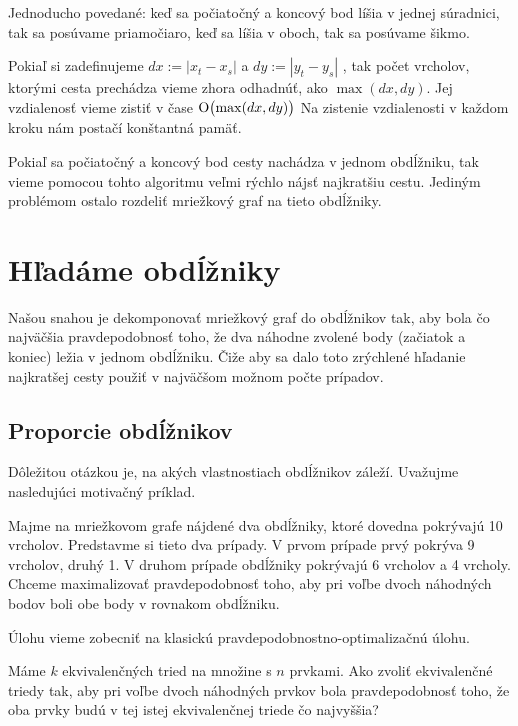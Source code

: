 Jednoducho povedané: keď sa počiatočný a koncový bod líšia v jednej súradnici, tak sa posúvame priamočiaro,
keď sa líšia v oboch, tak sa posúvame šikmo.


Pokiaľ si zadefinujeme 
$ dx := |x_t - x_s|$ 
a
$ dy :=|y_t - y_s| $
 , tak počet vrcholov,
ktorými cesta prechádza vieme zhora odhadnúť, ako $\max(dx, dy)$. Jej vzdialenosť vieme zistiť v čase  $\operatorname{O}\bigl(\max(dx, dy)\bigr)$
Na zistenie vzdialenosti v každom kroku nám postačí konštantná pamäť.


Pokiaľ sa počiatočný a koncový bod cesty nachádza v jednom obdĺžniku, tak vieme pomocou tohto algoritmu veľmi rýchlo nájsť najkratšiu cestu.
Jediným problémom ostalo rozdeliť mriežkový graf na tieto obdĺžniky. 


\section{Hľadáme obdĺžniky}
Našou snahou je dekomponovať mriežkový graf do obdĺžnikov tak, aby bola čo najväčšia pravdepodobnosť toho, že 
dva náhodne zvolené body (začiatok a koniec) ležia v jednom obdĺžniku. Čiže aby sa dalo toto zrýchlené
hľadanie najkratšej cesty použiť v najväčšom možnom počte prípadov.


\subsection{Proporcie obdĺžnikov}

Dôležitou otázkou je, na akých vlastnostiach obdĺžnikov záleží. Uvažujme nasledujúci motivačný príklad.
\begin{example}
Majme na mriežkovom grafe nájdené dva obdĺžniky, ktoré dovedna pokrývajú 10 vrcholov.
Predstavme si tieto dva prípady. V prvom prípade prvý pokrýva 9 vrcholov, druhý 1. V druhom prípade obdĺžniky pokrývajú 6 vrcholov a 4 vrcholy.
Chceme maximalizovať pravdepodobnosť toho, aby pri voľbe dvoch náhodných bodov boli obe body v rovnakom obdĺžniku.
\end{example}

Úlohu vieme zobecniť na klasickú pravdepodobnostno-optimalizačnú úlohu.

\begin{example}
Máme $k$ ekvivalenčných tried na množine s $n$ prvkami. Ako zvoliť ekvivalenčné triedy tak, 
aby pri voľbe dvoch náhodných prvkov bola pravdepodobnosť toho, 
že oba prvky budú v tej istej ekvivalenčnej triede čo najvyššia?
\end{example}

